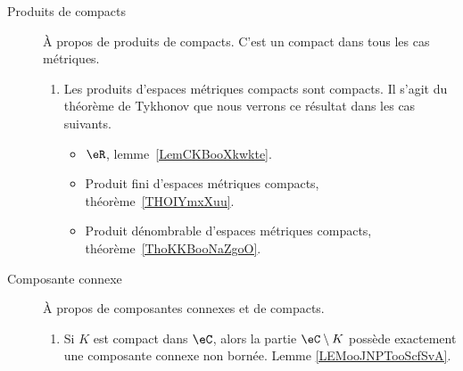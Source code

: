 \begin{description}
	\item[Produits de compacts]
	      À propos de produits de compacts. C'est un compact dans tous les cas métriques.
	      \begin{enumerate}
		      \item
		            Les produits d'espaces métriques compacts sont compacts. Il s'agit du théorème de Tykhonov que nous verrons ce résultat dans les cas suivants.
		            \begin{itemize}
			            \item
			                  \( \eR\), lemme~\ref{LemCKBooXkwkte}.
			            \item
			                  Produit fini d'espaces métriques compacts, théorème~\ref{THOIYmxXuu}.
			            \item
			                  Produit dénombrable d'espaces métriques compacts, théorème~\ref{ThoKKBooNaZgoO}.
		            \end{itemize}
	      \end{enumerate}
      \item[Composante connexe]
          À propos de composantes connexes et de compacts.
          \begin{enumerate}
              \item
                  Si \( K\) est compact dans \( \eC\), alors la partie \( \eC\setminus K\) possède exactement une composante connexe non bornée. Lemme \ref{LEMooJNPTooScfSvA}.
          \end{enumerate}
\end{description}


